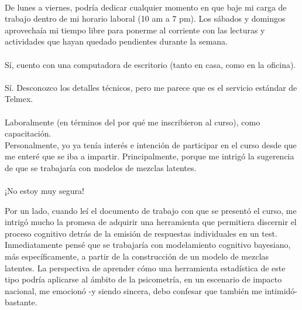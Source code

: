 \documentclass[11pt]{article}
\begin{document}
\begin{question}
\\
De lunes a viernes, podría dedicar cualquier momento en que baje mi carga de trabajo dentro de mi horario laboral (10 am a 7 pm). Los sábados y domingos aprovechaía mi tiempo libre para ponerme al corriente con las lecturas y actividades que hayan quedado pendientes durante la semana.\\

\\
Sí, cuento con una computadora de escritorio (tanto en casa, como en la oficina).\\

\\
Sí. Desconozco los detalles técnicos, pero me parece que es el servicio estándar de Telmex.\\

\\
Laboralmente (en términos del por qué me inscribieron al curso), como capacitación.\\

Personalmente, yo ya tenía interés e intención de participar en el curso desde que me enteré que se iba a impartir. Principalmente, porque me intrigó la sugerencia de que se trabajaría con modelos de mezclas latentes.\\

\\
¡No estoy muy segura!

Por un lado, cuando leí el documento de trabajo con que se presentó el curso, me intrigó mucho la promesa de adquirir una herramienta que permitiera discernir el proceso cognitivo detrás de la emisión de respuestas individuales en un test. Inmediatamente pensé que se trabajaría con modelamiento cognitivo bayesiano, más específicamente, a partir de la construcción de un modelo de mezclas latentes. La perspectiva de aprender cómo una herramienta estadística de este tipo podría aplicarse al ámbito de la psicometría, en un escenario de impacto nacional, me emocionó -y siendo sincera, debo confesar que también me intimidó- bastante.\\


\end{question}
\end{document}
